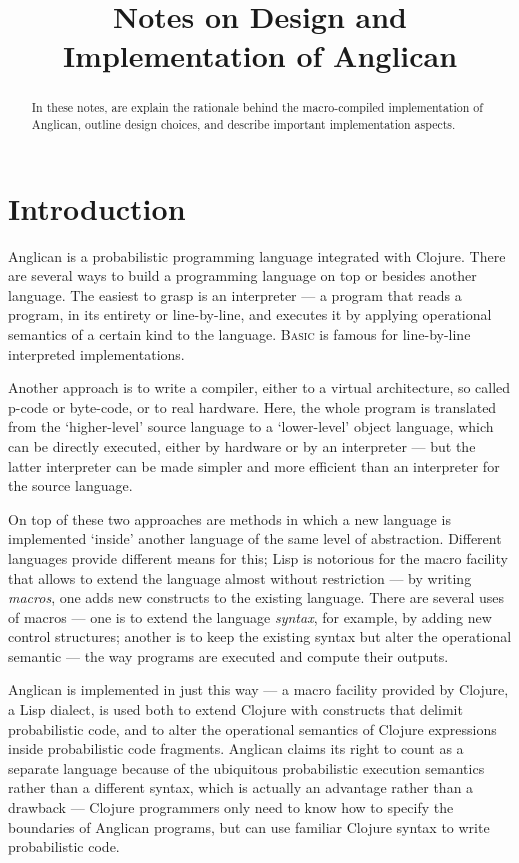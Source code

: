 \documentclass[a4paper]{article}
\title{Notes on Design and Implementation of Anglican}
\begin{document}
\maketitle

\begin{abstract}
	In these notes, are explain the rationale behind the
	macro-compiled implementation of Anglican, outline
	design choices, and describe important implementation
	aspects.
\end{abstract}

\section{Introduction}

Anglican is a probabilistic programming language integrated with
Clojure.  There are several ways to build a programming language
on top or besides another language.  The easiest to grasp is an
interpreter --- a program that reads a program, in its entirety
or line-by-line, and executes it by applying operational
semantics of a certain kind to the language. \textsc{Basic} is
famous for line-by-line interpreted implementations.

Another approach is to write a compiler, either to a virtual
architecture, so called p-code or byte-code, or to real
hardware. Here, the whole program is translated from the
`higher-level' source language to a `lower-level' object
language, which can be directly executed, either by hardware or
by an interpreter --- but the latter interpreter can be made
simpler and more efficient  than an interpreter for the source
language.

On top of these two approaches are methods in which a new
language is implemented `inside' another language of the same
level of abstraction. Different languages provide different
means for this; Lisp is notorious for the macro facility
that allows to extend the language almost without
restriction --- by writing \textit{macros}, one adds new
constructs to the existing language. There are several uses of
macros --- one is to extend the language \textit{syntax}, for
example, by adding new control structures; another is to keep
the existing syntax but alter the operational semantic --- the
way programs are executed and compute their outputs.

Anglican is implemented in just this way --- a macro facility
provided by Clojure, a Lisp dialect, is used both to extend
Clojure with constructs that delimit probabilistic code, and to
alter the operational semantics of Clojure expressions inside
probabilistic code fragments. Anglican claims its right to count
as a separate language because of the ubiquitous probabilistic
execution semantics rather than a different syntax,
which is actually an advantage rather than a drawback ---
Clojure programmers only need to know how to specify the
boundaries of Anglican programs, but can use familiar Clojure
syntax to write probabilistic code. 
\end{document}

